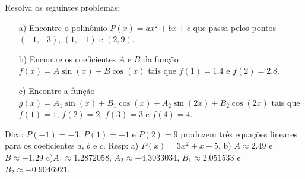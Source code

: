 \begin{Exercise}[title= Interpolação] Resolva os seguintes problemas:
\begin{itemize}
\item[a)] Encontre o polinômio $P(x)=ax^2+bx+c$ que passa pelos pontos $(-1,-3)$, $(1,-1)$ e $(2,9)$.
\item[b)] Encontre os coeficientes $A$ e $B$ da função $f(x)=A\sin(x)+B\cos(x)$ tais que $f(1)=1.4$ e $f(2)=2.8$.
\item[c)] Encontre a função $g(x)=A_1\sin(x)+B_1\cos(x) + A_2\sin(2x)+B_2\cos(2x)$ tais que $f(1)=1$, $f(2)=2$, $f(3)=3$ e $f(4)=4$.
\end{itemize}
\end{Exercise}
\begin{Answer}
  \begin{tiny}
Dica: $P(-1)=-3$, $P(1)=-1$ e $P(2)=9$ produzem três equações lineares para os coeficientes $a$, $b$ e $c$.
Resp: a) $P(x)=3x^2+x-5$, b) $A\approx 2.49$ e $B\approx -1.29$ c)$A_1\approx 1.2872058$, $A_2\approx - 4.3033034$, $B_1\approx 2.051533$ e $B_2\approx - 0.9046921$.    
  \end{tiny}
\end{Answer}


%

